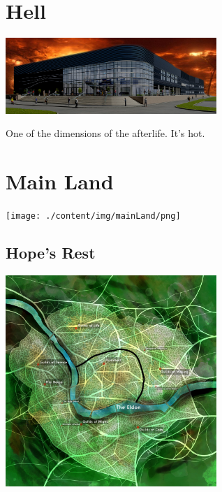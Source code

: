 \section{Hell}

\begin{center}
\includegraphics[width=80mm]{./content/img/hellBuilding.jpg}
\begin{figure}[h]
\end{figure}
\end{center}

One of the dimensions of the afterlife. It's hot.

\section{Main Land}

\begin{center}
\texttt{[image: ./content/img/mainLand/png]}
\begin{figure}[h]
\end{figure}
\end{center}


\subsection*{Hope's Rest} 

\vspace{5mm}

\begin{center}
\includegraphics[width=80mm]{./content/img/hopesRest.png}
\begin{figure}[h]
\end{figure}
\end{center}

